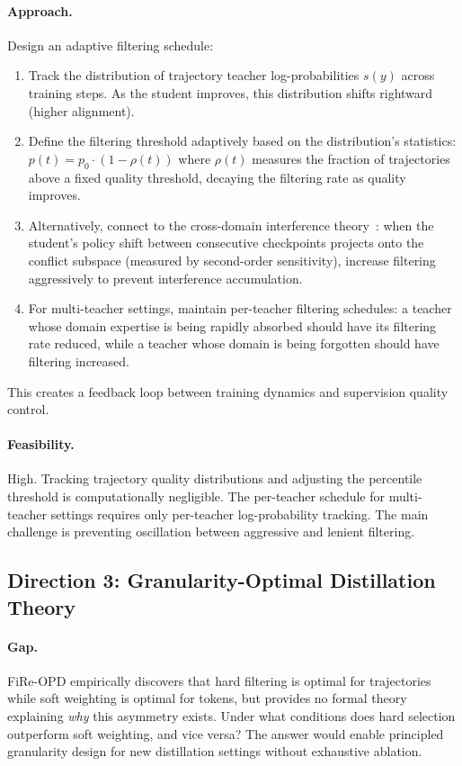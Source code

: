 \documentclass[11pt,a4paper]{article}
\begin{document}
\paragraph{Approach.} Design an adaptive filtering schedule:
\begin{enumerate}
\item Track the distribution of trajectory teacher log-probabilities $s(y)$ across training steps. As the student improves, this distribution shifts rightward (higher alignment).
\item Define the filtering threshold adaptively based on the distribution's statistics: $p(t) = p_0 \cdot (1 - \rho(t))$ where $\rho(t)$ measures the fraction of trajectories above a fixed quality threshold, decaying the filtering rate as quality improves.
\item Alternatively, connect to the cross-domain interference theory~\cite{yang2026perturbation}: when the student's policy shift between consecutive checkpoints projects onto the conflict subspace (measured by second-order sensitivity), increase filtering aggressively to prevent interference accumulation.
\item For multi-teacher settings, maintain per-teacher filtering schedules: a teacher whose domain expertise is being rapidly absorbed should have its filtering rate reduced, while a teacher whose domain is being forgotten should have filtering increased.
\end{enumerate}
This creates a feedback loop between training dynamics and supervision quality control.

\paragraph{Feasibility.} High. Tracking trajectory quality distributions and adjusting the percentile threshold is computationally negligible. The per-teacher schedule for multi-teacher settings requires only per-teacher log-probability tracking. The main challenge is preventing oscillation between aggressive and lenient filtering.

\subsection{Direction 3: Granularity-Optimal Distillation Theory}

\paragraph{Gap.} FiRe-OPD empirically discovers that hard filtering is optimal for trajectories while soft weighting is optimal for tokens, but provides no formal theory explaining \emph{why} this asymmetry exists. Under what conditions does hard selection outperform soft weighting, and vice versa? The answer would enable principled granularity design for new distillation settings without exhaustive ablation.
\end{document}
